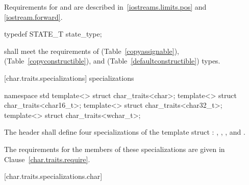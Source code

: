 \begin{itemdescr}
\pnum
\requires
Requirements for
and
are described in~\ref{iostreams.limits.pos} and \ref{iostream.forward}.
\end{itemdescr}

%
%
\begin{itemdecl}
typedef STATE_T state_type;
\end{itemdecl}

\begin{itemdescr}
\pnum
\requires
{}
shall meet the requirements of
 (Table~\ref{copyassignable}),
 (Table~\ref{copyconstructible}), and
 (Table~\ref{defaultconstructible}) types.
\end{itemdescr}

[char.traits.specializations]{ specializations}

%
\begin{codeblock}
namespace std {
  template<> struct char_traits<char>;
  template<> struct char_traits<char16_t>;
  template<> struct char_traits<char32_t>;
  template<> struct char_traits<wchar_t>;
}
\end{codeblock}

\pnum
The header
shall define four
specializations of the template struct
:
,
,
,
and
.

\pnum
The requirements for the members of these specializations are given in
Clause~\ref{char.traits.require}.

[char.traits.specializations.char]{}

